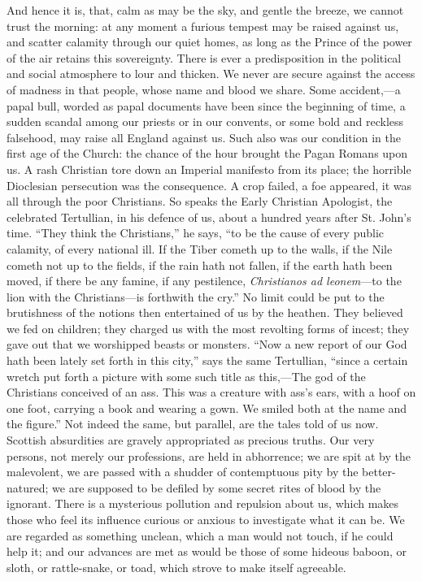 And hence it is, that, calm as may be the sky, and
gentle the breeze, we cannot trust the morning: at any
moment a furious tempest may be raised against us, and
scatter calamity through our quiet homes, as long as the
Prince of the power of the air retains this sovereignty.
There is ever a predisposition in the political and
social atmosphere to lour and thicken. We never are
secure against the access of madness in that people,
whose name and blood we share. Some accident,—a
papal bull, worded as papal documents have been since the
beginning of time, a sudden scandal among our priests or
in our convents, or some bold and reckless falsehood, may
raise all England against us. Such also was our condition
in the first age of the Church: the chance of the hour
brought the Pagan Romans upon us. A rash Christian tore
down an Imperial manifesto from its place; the horrible
Dioclesian persecution was the consequence. A crop
failed, a foe appeared, it was all through the poor
Christians. So speaks the Early Christian Apologist, the
celebrated Tertullian, in his defence of us, about a
hundred years after St. John's time. ``They think the
Christians,'' he says, ``to be the cause of every
public calamity, of every national ill. If the Tiber
cometh up to the walls, if the Nile cometh not up to the
fields, if the rain hath not fallen, if the earth hath
been moved, if there be any famine, if any pestilence, \emph{Christianos
ad leonem}—to the lion with the
Christians—is forthwith the cry.'' No limit
could be put to the brutishness of the notions then
entertained of us by the heathen. They believed we fed on
children; they charged us with the most revolting forms
of incest; they gave out that we worshipped beasts or
monsters. ``Now a new report of our God hath been
lately set forth in this city,'' says the same
Tertullian, ``since a certain wretch put forth a
picture with some such title as this,—The god of the
Christians conceived of an ass. This was a creature with
ass's ears, with a hoof on one foot, carrying a book and
wearing a gown. We smiled both at the name and the
figure.'' Not indeed the same, but parallel, are the
tales told of us now. Scottish absurdities are gravely
appropriated as precious truths. Our very persons, not
merely our professions, are held in abhorrence; we are
spit at by the malevolent, we are passed with a shudder
of contemptuous pity by the better-natured; we are
supposed to be defiled by some secret rites of blood by
the ignorant. There is a mysterious pollution and
repulsion about us, which makes those who feel its
influence curious or anxious to investigate what it can
be. We are regarded as something unclean, which a man
would not touch, if he could help it; and our advances
are met as would be those of some hideous baboon, or
sloth, or rattle-snake, or toad, which strove to make
itself agreeable.

